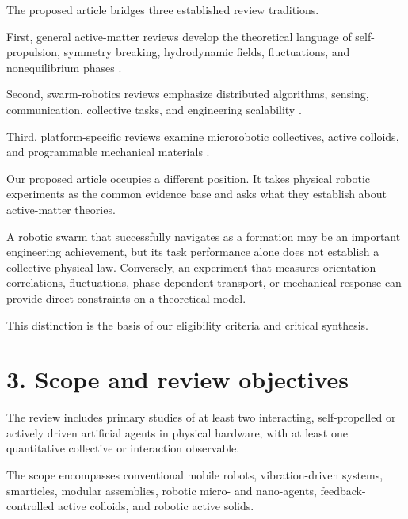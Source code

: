 The proposed article bridges three established
review traditions.

First, general active-matter reviews develop
the theoretical language of self-propulsion,
symmetry breaking, hydrodynamic fields,
fluctuations, and nonequilibrium phases
.

Second, swarm-robotics reviews emphasize
distributed algorithms, sensing, communication,
collective tasks, and engineering scalability
.

Third, platform-specific reviews examine
microrobotic collectives, active colloids,
and programmable mechanical materials
.

Our proposed article occupies a different
position. It takes physical robotic experiments
as the common evidence base and asks what
they establish about active-matter theories.

A robotic swarm that successfully navigates
as a formation may be an important engineering
achievement, but its task performance alone
does not establish a collective physical law.
Conversely, an experiment that measures
orientation correlations, fluctuations,
phase-dependent transport, or mechanical
response can provide direct constraints
on a theoretical model.

This distinction is the basis of our
eligibility criteria and critical synthesis.

\section*{3. Scope and review objectives}

The review includes primary studies of at least
two interacting, self-propelled or actively
driven artificial agents in physical hardware,
with at least one quantitative collective
or interaction observable.

The scope encompasses conventional mobile robots,
vibration-driven systems, smarticles, modular
assemblies, robotic micro- and nano-agents,
feedback-controlled active colloids, and
robotic active solids.

